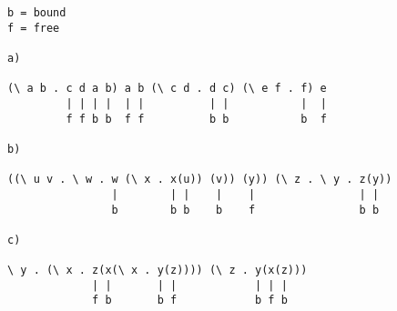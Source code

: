 \begin{verbatim}
b = bound
f = free

a)

(\ a b . c d a b) a b (\ c d . d c) (\ e f . f) e
         | | | |  | |          | |           |  |
         f f b b  f f          b b           b  f
         
b)

((\ u v . \ w . w (\ x . x(u)) (v)) (y)) (\ z . \ y . z(y))
                |        | |    |    |                | |
                b        b b    b    f                b b
                
c)

\ y . (\ x . z(x(\ x . y(z)))) (\ z . y(x(z)))
             | |       | |            | | |
             f b       b f            b f b
\end{verbatim}